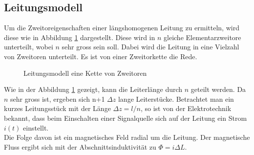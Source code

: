 \subsection{Leitungsmodell}
Um die Zweitoreigenschaften einer längshomogenen Leitung zu ermitteln, wird diese wie in
Abbildung \ref{fig:LeitungsmodellZweitorKette} dargestellt. Diese wird in $n$ gleiche Elementarzweitore unterteilt, wobei $n$ sehr gross sein soll. Dabei wird die Leitung in eine Vielzahl von Zweitoren unterteilt. Es ist von einer Zweitorkette die Rede.
\begin{figure}[!ht]
	\begin{center}
	\end{center}
\caption{Leitungsmodell eine Kette von Zweitoren}
\label{fig:LeitungsmodellZweitorKette}
\end{figure}
Wie in der Abbildung \ref{fig:LeitungsmodellZweitorKette} gezeigt, kann die Leiterlänge durch $n$ geteilt werden. Da $n$ sehr gross ist, ergeben sich n+1 $\Delta z$ lange Leiterstücke. Betrachtet man ein kurzes Leitungsstück mit der Länge $\Delta z = l/n$, so ist von der Elektrotechnik  bekannt, dass beim Einschalten einer Signalquelle sich auf der Leitung ein Strom $i(t)$ einstellt. \\
Die Folge davon ist ein magnetisches Feld radial um die Leitung. Der magnetische Fluss ergibt sich mit der Abschnittsinduktivität zu $\Phi = i  \Delta L$. \\
